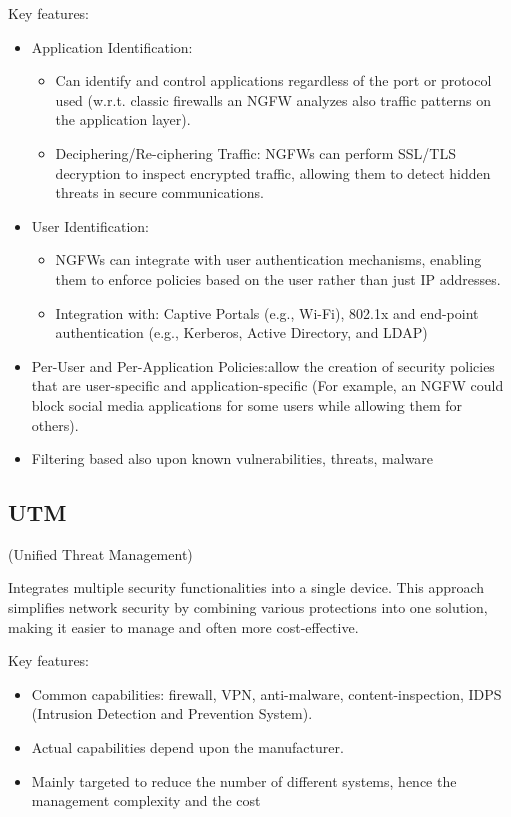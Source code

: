 Key features:
\begin{itemize}
    \item Application Identification: 
    \begin{itemize}
        \item Can identify and control applications regardless of the port or protocol used (w.r.t. classic firewalls an NGFW analyzes also traffic patterns on the application layer).
        \item Deciphering/Re-ciphering Traffic: NGFWs can perform SSL/TLS decryption to inspect encrypted traffic, allowing them to detect hidden threats in secure communications.
    \end{itemize}
    \item User Identification:
    \begin{itemize}
        \item NGFWs can integrate with user authentication mechanisms, enabling them to enforce policies based on the user rather than just IP addresses.
        \item Integration with: Captive Portals (e.g., Wi-Fi), 802.1x and end-point authentication (e.g., Kerberos, Active Directory, and LDAP)
    \end{itemize}
    \item Per-User and Per-Application Policies:allow the creation of security policies that are user-specific and application-specific (For example, an NGFW could block social media applications for some users while allowing them for others).
    \item Filtering based also upon known vulnerabilities, threats, malware
\end{itemize}

\subsection{UTM}
\begin{center}
    (Unified Threat Management)
\end{center}
Integrates multiple security functionalities into a single device. This approach simplifies network security by combining various protections into one solution, making it easier to manage and often more cost-effective.

\hfill 

Key features:
\begin{itemize}
    \item Common capabilities: firewall, VPN, anti-malware, content-inspection, IDPS (Intrusion Detection and Prevention System).
    \item Actual capabilities depend upon the manufacturer.
    \item Mainly targeted to reduce the number of different systems,
    hence the management complexity and the cost
\end{itemize}


